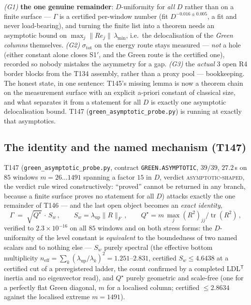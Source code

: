 \documentclass[11pt,a4paper]{article}
\begin{document}
\begin{keybox}
\emph{(G1)} \textbf{the one genuine remainder}: $D$-uniformity for \emph{all} $D$ rather than
on a finite surface --- $\Gamma$ is a certified per-window number (fit $D^{-0.016\pm0.005}$, a
fit and never load-bearing), and turning the finite list into a theorem needs an asymptotic
bound on $\max_j\|Re_j\|\,\lambda_{\min}$, i.e.\ the delocalisation of the \emph{Green
columns} themselves. \emph{(G2)} $\sigma_{\mathrm{tot}}$ on the energy route stays measured
--- \emph{not} a hole (either constant alone closes S1$'$, and the Green route is the
certified one), recorded so nobody mistakes the asymmetry for a gap. \emph{(G3)} the
\emph{actual} $3$ open R4 border blocks from the T134 assembly, rather than a proxy pool ---
bookkeeping. The honest state, in one sentence: T145's missing lemma is now a theorem chain on
the measurement surface with an explicit a-priori constant of classical size, and what
separates it from a statement for all $D$ is exactly one asymptotic delocalisation bound.
T147 (\texttt{green\_asymptotic\_probe.py}) is running at exactly that asymptotics.
\end{keybox}

\subsection{The identity and the named mechanism (T147)}
T147 (\texttt{green\_asymptotic\_probe.py}, contract \texttt{GREEN.ASYMPTOTIC}, $39/39$,
$27.2$\,s on $85$ windows $m=26\ldots1491$ spanning a factor $15$ in $D$, verdict
\textsc{asymptotic-shaped}, the verdict rule wired constructively: ``proved'' cannot be returned
in any branch, because a finite surface proves no statement for all $D$) attacks exactly the one
remainder of T146 --- and the last open object becomes an \emph{exact identity},
\[
\Gamma\;=\;\sqrt{Q^\star}\,\cdot\,S_w\,,\qquad
S_w=\lambda_{\mathrm{up}}\|R\|_F\,,\qquad
Q^\star=m\,\max_j (R^2)_{jj}/\operatorname{tr}(R^2)\,,
\]
verified to $2.3\times10^{-16}$ on all $85$ windows and on both stress forms: the $D$-uniformity
of the level constant is \emph{equivalent} to the boundedness of two named scalars and to nothing
else --- $S_w$ purely spectral (the effective bottom multiplicity
$n_{\mathrm{eff}}=\sum_k(\lambda_{\mathrm{up}}/\lambda_k)^2=1.251$--$2.831$, certified
$S_w\le4.6438$ at a certified cut of a preregistered ladder, the count confirmed by a completed
LDL$^{\mathsf T}$ inertia and no eigenvector read), and $Q^\star$ purely geometric and scale-free
(one for a perfectly flat Green diagonal, $m$ for a localised column; certified $\le2.8634$
against the localised extreme $m=1491$).
\end{document}
